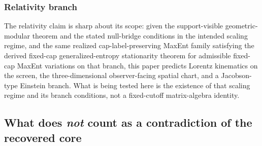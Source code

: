 \documentclass[11pt]{article}
\begin{document}
\subsubsection{Relativity branch}

The relativity claim is sharp about its scope: given the support-visible geometric-modular theorem and the stated null-bridge conditions in the intended scaling regime, and the same realized cap-label-preserving MaxEnt family satisfying the derived fixed-cap generalized-entropy stationarity theorem for admissible fixed-cap MaxEnt variations on that branch, this paper predicts Lorentz kinematics on the screen, the three-dimensional observer-facing spatial chart, and a Jacobson-type Einstein branch. What is being tested here is the existence of that scaling regime and its branch conditions, not a fixed-cutoff matrix-algebra identity.

\subsection{What does \emph{not} count as a contradiction of the recovered core}
\end{document}
